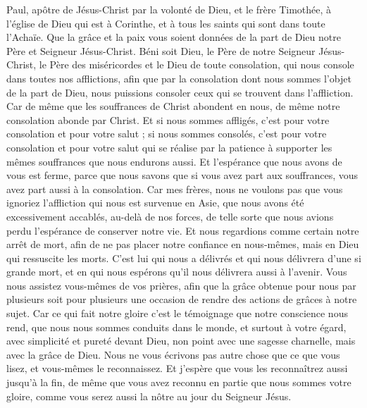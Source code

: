 \begin{multicols}{2}
\TextTitle{[Introduction]}
\VerseOne{}Paul, apôtre de Jésus-Christ par la volonté de Dieu, et le frère Timothée, à l'église de Dieu qui est à Corinthe, et à tous les saints qui sont dans toute l'Achaïe.
Que la grâce et la paix vous soient données de la part de Dieu notre Père et Seigneur Jésus-Christ.
Béni soit Dieu, le Père de notre Seigneur Jésus-Christ, le Père des miséricordes et le Dieu de toute consolation,
qui nous console dans toutes nos afflictions, afin que par la consolation dont nous sommes l’objet de la part de Dieu, nous puissions consoler ceux qui se trouvent dans l’affliction.
Car de même que les souffrances de Christ abondent en nous, de même notre consolation abonde par Christ.
Et si nous sommes affligés, c'est pour votre consolation et pour votre salut ; si nous sommes consolés, c'est pour votre consolation et pour votre salut qui se réalise par la patience à supporter les mêmes souffrances que nous endurons aussi.
Et l'espérance que nous avons de vous est ferme, parce que nous savons que si vous avez part aux souffrances, vous avez part aussi à la consolation.
Car mes frères, nous ne voulons pas que vous ignoriez l’affliction qui nous est survenue en Asie, que nous avons été excessivement accablés, au-delà de nos forces, de telle sorte que nous avions perdu l'espérance de conserver notre vie.
Et nous regardions comme certain notre arrêt de mort, afin de ne pas placer notre confiance en nous-mêmes, mais en Dieu qui ressuscite les morts.
C’est lui qui nous a délivrés et qui nous délivrera d'une si grande mort, et en qui nous espérons qu'il nous délivrera aussi à l'avenir.
Vous nous assistez vous-mêmes de vos prières, afin que la grâce obtenue pour nous par plusieurs soit pour plusieurs une occasion de rendre des actions de grâces à notre sujet.
Car ce qui fait notre gloire c’est le témoignage que notre conscience nous rend, que nous nous sommes conduits dans le monde, et surtout à votre égard, avec simplicité et pureté devant Dieu, non point avec une sagesse charnelle, mais avec la grâce de Dieu.
Nous ne vous écrivons pas autre chose que ce que vous lisez, et vous-mêmes le reconnaissez. Et j'espère que vous les reconnaîtrez aussi jusqu'à la fin,
de même que vous avez reconnu en partie que nous sommes votre gloire, comme vous serez aussi la nôtre au jour du Seigneur Jésus.

\end{multicols}
